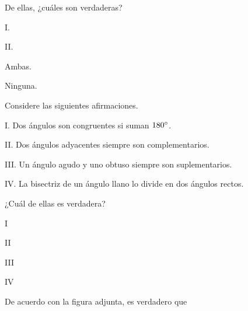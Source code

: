 \documentclass[12pt, fleqn]{article}
\begin{document}
De ellas, ¿cuáles son {\sc verdaderas}?
\benu
\item[] \opc I.
\item[] \opc II.
\item[] \opc Ambas.
\item[] \opc Ninguna.
\eenu
\vs

\item Considere las siguientes afirmaciones. \vp

\begin{tcolorbox}
\benu
\item[I.] Dos ángulos son congruentes si suman $180^\circ$.
\item[II.] Dos ángulos adyacentes siempre son complementarios.
\item[III.] Un ángulo agudo y uno obtuso siempre son suplementarios.
\item[IV.] La bisectriz de un ángulo llano lo divide en dos ángulos rectos.
\eenu
\end{tcolorbox}

¿Cuál de ellas es {\sc verdadera}?
\benu
\item[] \opc I
\item[] \opc II
\item[] \opc III
\item[] \opc IV
\eenu
\vs

\pagebreak

\item De acuerdo con la figura adjunta, es verdadero que
\end{document}
